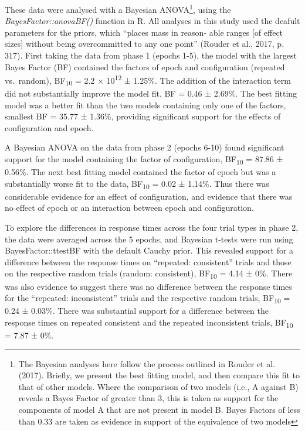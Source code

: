 \documentclass[
  man,floatsintext]{apa7}
\begin{document}
These data were analysed with a Bayesian ANOVA\footnote{The Bayesian analyses here follow the process outlined in Rouder et al. (2017). Briefly, we present the best fitting model, and then compare this fit to that of other models. Where the comparison of two models (i.e., A against B) reveals a Bayes Factor of greater than 3, this is taken as support for the components of model A that are not present in model B. Bayes Factors of less than 0.33 are taken as evidence in support of the equivalence of two models}, using the \emph{BayesFactor::anovaBF()} function in R. All analyses in this study used the deafult parameters for the priors, which ``places mass in reason-
able ranges {[}of effect sizes{]} without being overcommitted to any one point'' (Rouder et al., 2017, p. 317). First taking the data from phase 1 (epochs 1-5), the model with the largest Bayes Factor (BF) contained the factors of epoch and configuration (repeated vs.~random), BF\textsubscript{10} = 2.2 × 10\textsuperscript{12} ± 1.25\%. The addition of the interaction term did not substantially improve the model fit, BF = 0.46 ± 2.69\%. The best fitting model was a better fit than the two models containing only one of the factors, smallest BF = 35.77 ± 1.36\%, providing significant support for the effects of configuration and epoch.

A Bayesian ANOVA on the data from phase 2 (epochs 6-10) found significant support for the model containing the factor of configuration, BF\textsubscript{10} = 87.86 ± 0.56\%. The next best fitting model contained the factor of epoch but was a substantially worse fit to the data, BF\textsubscript{10} = 0.02 ± 1.14\%. Thus there was considerable evidence for an effect of configuration, and evidence that there was no effect of epoch or an interaction between epoch and configuration.

To explore the differences in response times across the four trial types in phase 2, the data were averaged across the 5 epochs, and Bayesian t-tests were run using BayesFactor::ttestBF with the default Cauchy prior. This revealed support for a difference between the response times on ``repeated: consistent'' trials and those on the respective random trials (random: consistent), BF\textsubscript{10} = 4.14 ± 0\%. There was also evidence to suggest there was no difference between the response times for the ``repeated: inconsistent'' trials and the respective random trials, BF\textsubscript{10} = 0.24 ± 0.03\%. There was substantial support for a difference between the response times on repeated consistent and the repeated inconsistent trials, BF\textsubscript{10} = 7.87 ± 0\%.
\end{document}

